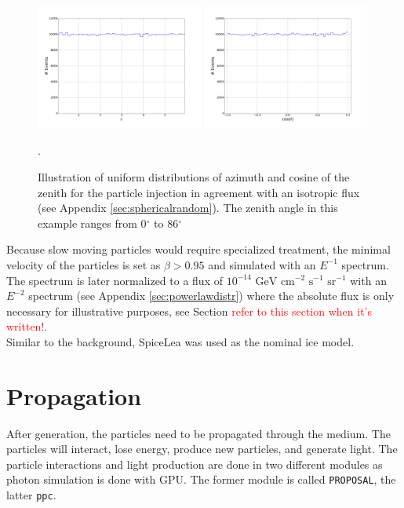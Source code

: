 \begin{figure}[t]
\centering
\includegraphics[width=0.49\textwidth]{chapter6/img/Azimuth}
\includegraphics[width=0.49\textwidth]{chapter6/img/Zenith_full}
\caption{Illustration of uniform distributions of azimuth and cosine of the zenith for the particle injection in agreement with an isotropic flux (see Appendix \ref{sec:sphericalrandom}). The zenith angle in this example ranges from 0$^\circ$ to 86$^\circ$ }.
\label{fig:angles}
\end{figure}

\noindent Because slow moving particles would require specialized treatment, the minimal velocity of the particles is set as $\beta > 0.95$ and simulated with an $E^{-1}$ spectrum. The spectrum is later normalized to a flux of $10^{-14} \textrm{ GeV } \textrm{cm}^{-2} \textrm{ s}^{-1} \textrm{ sr}^{-1}$ with an $E^{-2}$ spectrum (see Appendix \ref{sec:powerlawdistr}) where the absolute flux is only necessary for illustrative purposes, see Section \textcolor{red}{refer to this section when it's written!}.\\

\noindent Similar to the background, SpiceLea was used as the nominal ice model.

\section{Propagation}
After generation, the particles need to be propagated through the medium. The particles will interact, lose energy, produce new particles, and generate light. The particle interactions and light production are done in two different modules as photon simulation is done with GPU. The former module is called \texttt{PROPOSAL}, the latter \texttt{ppc}.




